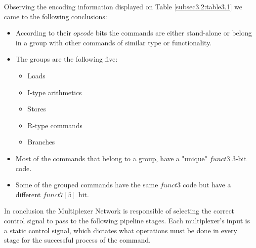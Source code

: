  	Observing the encoding information displayed on Table \ref{subsec3.2:table3.1} we came to the following conclusions:
 	\begin{itemize}
 		\item According to their $opcode$ bits the commands are either stand-alone or belong in a group with other commands of similar type or functionality.
 		\item The groups are the following five:
 		\begin{itemize}
 			\item Loads
 			\item I-type arithmetics
 			\item Stores
 			\item R-type commands
 			\item Branches
 		\end{itemize}
 		\item Most of the commands that belong to a group, have a "unique" $funct3$ 3-bit code. 
 		\item Some of the grouped commands have the same $funct3$ code but have a different $funct7[5]$ bit.
 	\end{itemize}	
 	\vspace{2mm}
 	
 		 In conclusion the Multiplexer Network is responsible of selecting the correct control signal to pass to the following pipeline stages. Each multiplexer's input is a static control signal, which dictates what operations must be done in every stage for the successful process of the command. 
		
	\clearpage
	
